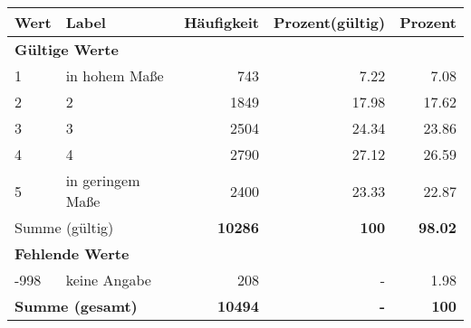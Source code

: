      \begin{longtable}{lXrrr}
     \toprule
     \textbf{Wert} & \textbf{Label} & \textbf{Häufigkeit} & \textbf{Prozent(gültig)} & \textbf{Prozent} \\
     \endhead
     \midrule
     \multicolumn{5}{l}{\textbf{Gültige Werte}}\\

     1 &
     \multicolumn{1}{X}{ in hohem Maße   } &


       \num{743} &
       \num[round-mode=places,round-precision=2]{7,22} &
         \num[round-mode=places,round-precision=2]{7,08} \\

     2 &
     \multicolumn{1}{X}{ 2   } &


       \num{1849} &
       \num[round-mode=places,round-precision=2]{17,98} &
         \num[round-mode=places,round-precision=2]{17,62} \\

     3 &
     \multicolumn{1}{X}{ 3   } &


       \num{2504} &
       \num[round-mode=places,round-precision=2]{24,34} &
         \num[round-mode=places,round-precision=2]{23,86} \\

     4 &
     \multicolumn{1}{X}{ 4   } &


       \num{2790} &
       \num[round-mode=places,round-precision=2]{27,12} &
         \num[round-mode=places,round-precision=2]{26,59} \\

     5 &
     \multicolumn{1}{X}{ in geringem Maße   } &


       \num{2400} &
       \num[round-mode=places,round-precision=2]{23,33} &
         \num[round-mode=places,round-precision=2]{22,87} \\
     \midrule
     \multicolumn{2}{l}{Summe (gültig)} &
       \textbf{\num{10286}} &
     \textbf{100} &
       \textbf{\num[round-mode=places,round-precision=2]{98,02}} \\
     \multicolumn{5}{l}{\textbf{Fehlende Werte}}\\
       -998 &
       keine Angabe &
         \num{208} &
        - &
         \num[round-mode=places,round-precision=2]{1,98} \\
     \midrule
     \multicolumn{2}{l}{\textbf{Summe (gesamt)}} &
          \textbf{\num{10494}} &
        \textbf{-} &
        \textbf{100} \\
     \bottomrule
     \end{longtable}
     
